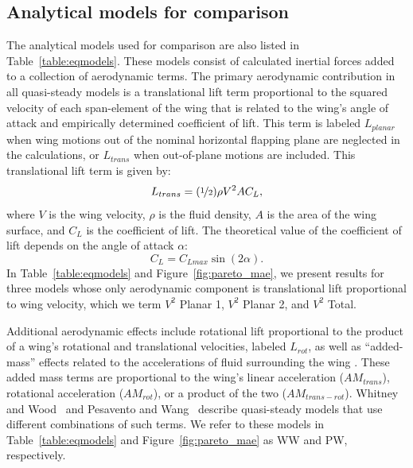 \documentclass{article}
\begin{document}
\subsection*{Analytical models for comparison}
The analytical models used for comparison are also listed in
Table~\ref{table:eqmodels}.  These models consist of calculated inertial forces
added to a collection of aerodynamic terms.  The primary aerodynamic
contribution in all quasi-steady models is a translational lift term
proportional to the squared velocity of each span-element of the wing that is
related to the wing's angle of attack and empirically determined coefficient of
lift.  This term is labeled $L_{planar}$ when wing motions out of the nominal
horizontal flapping plane are neglected in the calculations, or $L_{trans}$ when
out-of-plane motions are included. This translational lift term is given by:
\begin{equation}
L_{trans}=(\nicefrac{1}{2})\rho V^2AC_L,
\end{equation}
where \(V\) is the wing velocity, \(\rho\) is the fluid density, \(A\) is the area of the wing surface, and \(C_L\) is the coefficient of lift.  The theoretical value of the coefficient of lift depends on the angle of attack \(\alpha\):
\begin{equation}
C_L = C_{Lmax}\sin(2\alpha).
\end{equation}
In Table~\ref{table:eqmodels} and Figure~\ref{fig:pareto_mae}, we present
results for three models whose only aerodynamic component is translational lift
proportional to wing velocity, which we term $V^2$ Planar 1, $V^2$ Planar 2, and
$V^2$ Total.


Additional aerodynamic effects include rotational lift proportional to the
product of a wing's rotational and translational velocities, labeled $L_{rot}$,
as well as ``added-mass'' effects related to the accelerations of fluid
surrounding the wing \cite{sedov1965two}.  These added mass terms are
proportional to the wing's linear acceleration ($AM_{trans}$), rotational
acceleration ($AM_{rot}$), or a product of the two ($AM_{trans-rot}$). Whitney
and Wood~\cite{whitney2010aeromechanics} and Pesavento and
Wang~\cite{pesavento2004falling} describe quasi-steady models that use different
combinations of such terms. We refer to these models in
Table~\ref{table:eqmodels} and Figure~\ref{fig:pareto_mae} as WW and PW, respectively.
\end{document}
